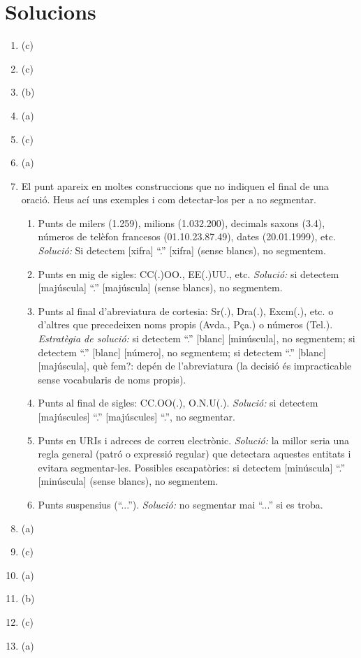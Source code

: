 \section{Solucions}
\begin{enumerate}
\item (c)
\item (c)
\item (b)
\item (a)
\item (c)
\item (a)
\item El punt apareix en moltes construccions que no indiquen el final de
   una oració. Heus ací uns exemples i com detectar-los per a no
   segmentar.

   \begin{enumerate}
   \item Punts de milers (1.259), milions (1.032.200), decimals saxons
     (3.4), números de telèfon francesos (01.10.23.87.49), dates
     (20.01.1999), etc. \emph{Solució:} 
     Si detectem [xifra] ``.'' [xifra] (sense blancs), no
     segmentem.
     
    \item Punts en mig de sigles: CC(.)OO., EE(.)UU.,
      etc. \emph{Solució:} 
      si detectem [majúscula] ``.'' [majúscula] (sense blancs),
     no segmentem.
     
    \item Punts al final d'abreviatura de cortesia: Sr(.), Dra(.),
     Excm(.), etc. o d'altres que precedeixen noms propis (Avda.,
     Pça.) o números (Tel.). \emph{Estratègia de solució:}
     si detectem ``.'' [blanc] [minúscula], no segmentem;  si detectem
     ``.'' [blanc] [número], no segmentem;    
     si detectem ``.'' [blanc] [majúscula], què fem?: depén de
     l'abreviatura (la decisió és impracticable sense vocabularis de
     noms propis).
  
     \item Punts al final de sigles: CC.OO(.), O.N.U(.). \emph{Solució:}
      si detectem [majúscules] ``.'' [majúscules] ``.'', no segmentar.
     
     \item Punts en URIs i adreces de correu electrònic.
       \emph{Solució:} la millor seria una regla general (patró o expressió
     regular) que detectara aquestes entitats i evitara segmentar-les.
     Possibles escapatòries:  
     si detectem [minúscula] ``.'' [minúscula] (sense blancs), no
     segmentem.
     
     \item Punts suspensius (``...''). \emph{Solució:}
      no segmentar mai ``...'' si es troba.
     
 \end{enumerate}

\item (a)
\item (c)
\item (a)
\item (b)
\item (c)
\item (a)


\end{enumerate}

